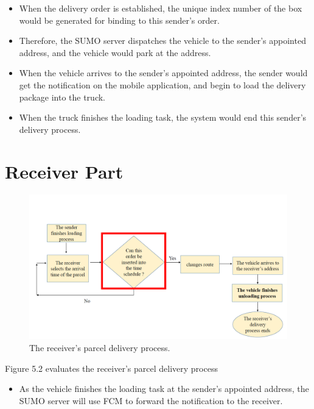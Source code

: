 \documentclass[12pt]{ksthesis}
\begin{document}
\begin{thesis}
{\begin{itemize}
\item
When the delivery order is established, the unique index number of the box would be generated for binding to this sender’s order.

\item
Therefore, the SUMO server dispatches the vehicle to the sender’s appointed address, and the vehicle would park at the address.

\item
When the vehicle arrives to the sender’s appointed address, the sender would get the notification on the mobile application, and begin to load the delivery package into the truck.

\item
When the truck finishes the loading task, the system would end this sender’s delivery process.

\end{itemize}

\section{Receiver Part}

\begin{figure}[H]
\centering
\includegraphics[width=1.14\textwidth]{./Thesis_figures/F5-2_receiver_delivery_process.PNG}
\caption{\large The receiver's parcel delivery process.}
\vspace{0.5cm}
\label{Fig:receiver_process}
\end{figure}

Figure 5.2 evaluates the receiver’s parcel delivery process

\begin{itemize}
\item
As the vehicle finishes the loading task at the sender’s appointed address, the SUMO server will use FCM to forward the notification to the receiver.


\end{itemize}}
\end{thesis}
\end{document}
